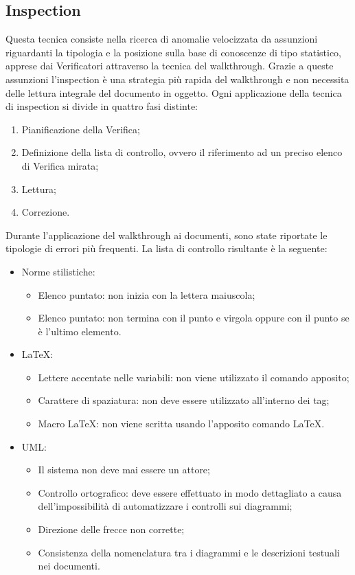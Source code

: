 \subsection{Inspection}
\label{11.3}
Questa tecnica consiste nella ricerca di anomalie velocizzata da assunzioni riguardanti la tipologia e la posizione sulla base di conoscenze di tipo statistico, apprese dai Verificatori attraverso la tecnica del walkthrough. Grazie a queste assunzioni l'inspection è una strategia più rapida del walkthrough e non necessita delle lettura integrale del documento in oggetto.
Ogni applicazione della tecnica di inspection si divide in quattro fasi distinte:
\begin{enumerate}
\item Pianificazione della Verifica;
\item Definizione della lista di controllo, ovvero il riferimento ad un preciso elenco di Verifica mirata;
\item Lettura;
\item Correzione.
\end{enumerate}
Durante l'applicazione del walkthrough ai documenti, sono state riportate le tipologie di errori più frequenti. La lista di controllo risultante è la seguente:
\begin{itemize}
\item Norme stilistiche:
	\begin{itemize}
	\item Elenco puntato: non inizia con la lettera maiuscola;
	\item Elenco puntato: non termina con il punto e virgola oppure con il punto se è l'ultimo elemento.
	\end{itemize}
\item \LaTeX:
	\begin{itemize}
	\item Lettere accentate nelle variabili: non viene utilizzato il comando apposito;
	\item Carattere di spaziatura: non deve essere utilizzato all'interno dei tag;
	\item Macro \LaTeX: non viene scritta usando l'apposito comando \LaTeX{}.
	\end{itemize}
\item UML:
	\begin{itemize}
	\item Il sistema non deve mai essere un attore;
	\item Controllo ortografico: deve essere effettuato in modo dettagliato a causa dell'impossibilità di automatizzare i controlli sui diagrammi;
	\item Direzione delle frecce non corrette;
	\item Consistenza della nomenclatura tra i diagrammi e le descrizioni testuali nei documenti.
	\end{itemize}
\end{itemize}
